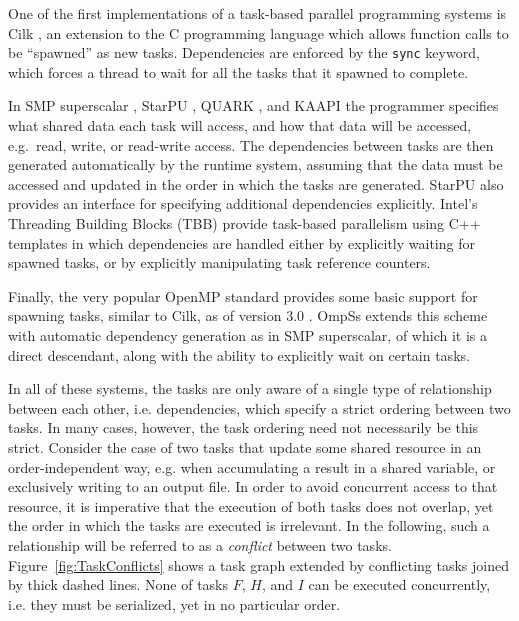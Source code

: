 \documentclass[fleqn,10pt]{wlpeerj}
\newcommand{\fig}[1]
    {Figure~\ref{fig:#1}}
\begin{document}
One of the first implementations of a task-based parallel programming
systems is Cilk \citep{ref:Blumofe1995}, an extension to the C
programming language which allows function calls to be ``spawned''
as new tasks.
Dependencies are enforced by the {\tt sync} keyword, which
forces a thread to wait for all the tasks that it spawned
to complete.

In SMP superscalar \citep{ref:Perez2008}, StarPU \citep{ref:Augonnet2011},
QUARK \citep{ref:Yarkhan2011}, and KAAPI \citep{ref:Gautier2007}
the programmer specifies
what shared data each task will access, and how that data will
be accessed, e.g.~read, write, or read-write access.
The dependencies between tasks are then generated
automatically by the runtime system, assuming that the
data must be accessed and updated in the order in which
the tasks are generated.
StarPU also provides an interface for specifying additional
dependencies explicitly.
Intel's Threading Building Blocks (TBB)
\citep{ref:Reinders2010}
provide task-based parallelism using C++ templates in which
dependencies are handled either by explicitly waiting
for spawned tasks, or by explicitly manipulating
task reference counters.

Finally, the very popular OpenMP standard provides some basic support
for spawning tasks, similar to Cilk, as of version 3.0
\citep{ref:OpenMP2008}.
OmpSs \citep{ref:Duran2011} extends this scheme with automatic
dependency generation as in SMP superscalar, of which it
is a direct descendant, along with
the ability to explicitly wait on certain tasks.

In all of these systems, the tasks are only aware of a single
type of relationship between each other, i.e. dependencies, which
specify a strict ordering between two tasks.
In many cases, however, the task ordering need not necessarily
be this strict.
Consider the case of two tasks that update some shared resource
in an order-independent way, e.g. when accumulating a result in
a shared variable, or exclusively writing to an output file.
In order to avoid concurrent access to that resource, it is
imperative that the execution of both tasks does not overlap,
yet the order in which the tasks are executed is irrelevant.
In the following, such a relationship will be referred to
as a {\em conflict} between two tasks.
\fig{TaskConflicts} shows a task graph extended by conflicting tasks
joined by thick dashed lines.
None of tasks $F$, $H$, and $I$ can be executed concurrently,
i.e. they must be serialized, yet in no particular order.
\end{document}

